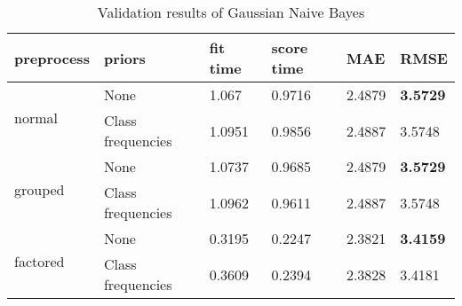 \begin{table}[H]
    \centering
    \begin{tabular}{ll|llll}
    \toprule
    \textbf{preprocess} & \textbf{priors} & \textbf{fit time} & \textbf{score time} & \textbf{MAE} & \textbf{RMSE} \\ \midrule
    \multirow{2}{*}{normal}   & None              & 1.067  & 0.9716 & 2.4879 & \textbf{3.5729} \\
                              & Class frequencies & 1.0951 & 0.9856 & 2.4887 & 3.5748          \\
    \multirow{2}{*}{grouped}  & None              & 1.0737 & 0.9685 & 2.4879 & \textbf{3.5729} \\
                              & Class frequencies & 1.0962 & 0.9611 & 2.4887 & 3.5748          \\
    \multirow{2}{*}{factored} & None              & 0.3195 & 0.2247 & 2.3821 & \textbf{3.4159} \\
                              & Class frequencies & 0.3609 & 0.2394 & 2.3828 & 3.4181          \\
    \bottomrule
    \end{tabular}
    \caption{Validation results of Gaussian Naive Bayes}
    \label{tab:val_nb}
    \end{table}